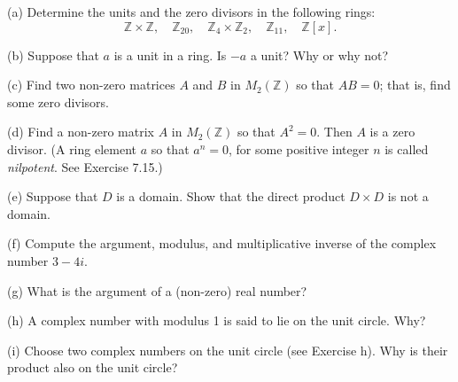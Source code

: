 \begin{problem}[Warmup]{(a)}
    Determine the units and the zero divisors in the following rings: \[\mathbb{Z} \times \mathbb{Z}, \quad \mathbb{Z}_{20}, \quad \mathbb{Z}_4 \times \mathbb{Z}_2, \quad \mathbb{Z}_{11}, \quad \mathbb{Z}[x].\]
\end{problem}
\unsolved

\begin{problem}[Warmup]{(b)}
    Suppose that $a$ is a unit in a ring. Is $-a$ a unit? Why or why not?
\end{problem}
\unsolved

\begin{problem}[Warmup]{(c)}
    Find two non-zero matrices $A$ and $B$ in $M_2(\mathbb{Z})$ so that $AB = 0$; that is, find some zero divisors.
\end{problem}
\unsolved

\begin{problem}[Warmup]{(d)}
    Find a non-zero matrix $A$ in $M_2(\mathbb{Z})$ so that $A^2 = 0$. Then $A$ is a zero divisor. (A ring element $a$ so that $a^n = 0$, for some positive integer $n$ is called \emph{nilpotent}. See Exercise 7.15.)
\end{problem}
\unsolved

\begin{problem}[Warmup]{(e)}
    Suppose that $D$ is a domain. Show that the direct product $D \times D$ is not a domain.
\end{problem}
\unsolved

\begin{problem}[Warmup]{(f)}
    Compute the argument, modulus, and multiplicative inverse of the complex number $3 - 4i$.
\end{problem}
\unsolved

\begin{problem}[Warmup]{(g)}
    What is the argument of a (non-zero) real number?
\end{problem}
\unsolved

\begin{problem}[Warmup]{(h)}
    A complex number with modulus 1 is said to lie on the unit circle. Why?
\end{problem}
\unsolved

\begin{problem}[Warmup]{(i)}
    Choose two complex numbers on the unit circle (see Exercise h). Why is their product also on the unit circle?
\end{problem}
\unsolved

